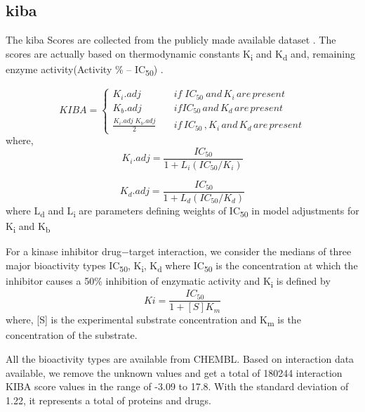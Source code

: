 \subsection{\acrfull{kiba}}
The \acrfull{kiba} Scores are collected from the publicly made available dataset \cite[\textit{Tang. et al.}]{Tang2013}. The scores are actually based on thermodynamic constants K\textsubscript{i} and K\textsubscript{d} and, remaining enzyme activity(Activity \% --  IC\textsubscript{50}) .

\begin{equation}
  KIBA = \begin{cases}
    K_i . {adj} & \quad {if} \; {IC_{50}\: and\, K_i \,are\, present} \\
    K_b.{adj} & \quad {if}  {IC_{50} \, and \, K_d \, are \, present} \\
    \frac{K_i . {adj} \; K_b.{adj}}{2} & \quad {if\, IC_{50}\,,K_i\, and \,K_d\, are\, present}
  \end{cases}
   \label{eq:kiba}
\end{equation}
where,
\begin{equation}
K_i.{adj} = \frac{IC_{50}}{1 + L_i(IC_{50}/K_i)}
\label{eq:ki_adj}
\end{equation}

\begin{equation}
K_d.{adj} = \frac{IC_{50}}{1 + L_d(IC_{50}/K_d)}
\end{equation}
where L\textsubscript{d} and L\textsubscript{i} are parameters defining weights of IC\textsubscript{50} in model adjustments for K\textsubscript{i} and K\textsubscript{b} 

For a kinase inhibitor drug−target interaction, we consider the medians of three major bioactivity types IC\textsubscript{50}, K\textsubscript{i}, K\textsubscript{d} where
IC\textsubscript{50} \cite{Tang2013} is the concentration at which the inhibitor causes a 50\% inhibition of enzymatic activity and K\textsubscript{i} is defined by \begin{equation}
    Ki = \frac{IC_{50}} {1 + [S]  K_m}
    \label{eq:ki}
\end{equation} 
where,  [{S}] is the experimental substrate concentration and K\textsubscript{m} is the concentration of the substrate.

All the bioactivity types are available from CHEMBL\cite{Gaulton2017}. Based on interaction data available, we remove the unknown values and get a total of 180244 interaction KIBA score values in the range of -3.09 to 17.8. With the standard deviation of 1.22, it represents a total of  proteins and  drugs.

